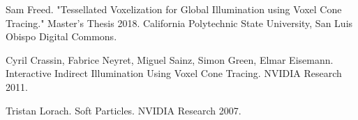 

\newpage
{}
\begin{thebibliography}{10}

Sam Freed. "Tessellated Voxelization for Global Illumination using Voxel Cone Tracing." Master's Thesis 2018. California Polytechnic State University, San Luis Obispo Digital Commons. 

Cyril Crassin, Fabrice Neyret, Miguel Sainz, Simon Green, Elmar Eisemann. Interactive Indirect Illumination Using Voxel Cone Tracing. NVIDIA Research 2011. 

Tristan Lorach. Soft Particles. NVIDIA Research 2007.

\end{thebibliography}
